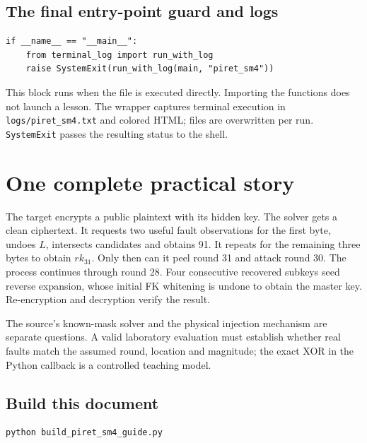 \documentclass[11pt,a4paper]{article}
\newcommand{\hx}[1]{\texttt{#1}}
\begin{document}
\subsection{The final entry-point guard and logs}
\begin{Verbatim}
if __name__ == "__main__":
    from terminal_log import run_with_log
    raise SystemExit(run_with_log(main, "piret_sm4"))
\end{Verbatim}
This block runs when the file is executed directly. Importing the functions
does not launch a lesson. The wrapper captures terminal execution in
\hx{logs/piret\_sm4.txt} and colored HTML; files are overwritten per run.
\hx{SystemExit} passes the resulting status to the shell.


\section{One complete practical story}
The target encrypts a public plaintext with its hidden key. The solver gets a
clean ciphertext. It requests two useful fault observations for the first byte,
undoes $L$, intersects candidates and obtains 91. It repeats for the remaining
three bytes to obtain $rk_{31}$. Only then can it peel round 31 and attack round
30. The process continues through round 28. Four consecutive recovered subkeys
seed reverse expansion, whose initial FK whitening is undone to obtain the
master key. Re-encryption and decryption verify the result.

The source's known-mask solver and the physical injection mechanism are separate
questions. A valid laboratory evaluation must establish whether real faults
match the assumed round, location and magnitude; the exact XOR in the Python
callback is a controlled teaching model.

\subsection{Build this document}
\begin{Verbatim}
python build_piret_sm4_guide.py
\end{Verbatim}

\end{document}
